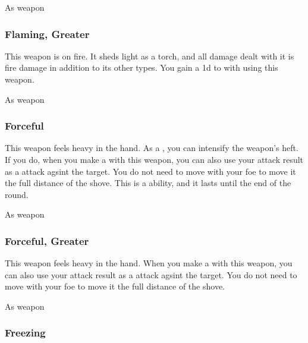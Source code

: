  As weapon


\lowercase{\hypertarget{item:Flaming, Greater}{}}\label{item:Flaming, Greater}
\hypertarget{item:Flaming, Greater}{\subsubsection{Flaming, Greater\hfill{}}}

This weapon is on fire.
It sheds light as a torch, and all damage dealt with it is fire damage in addition to its other types.
You gain a \plus1d  to  with  using this weapon.



 


 As weapon


\lowercase{\hypertarget{item:Forceful}{}}\label{item:Forceful}
\hypertarget{item:Forceful}{\subsubsection{Forceful\hfill{}}}

This weapon feels heavy in the hand.
As a , you can intensify the weapon's heft.
If you do, when you make a  with this weapon, you can also use your attack result as a  attack agsint the target.
You do not need to move with your foe to move it the full distance of the shove.
This is a  ability, and it lasts until the end of the round.



 As weapon


\lowercase{\hypertarget{item:Forceful, Greater}{}}\label{item:Forceful, Greater}
\hypertarget{item:Forceful, Greater}{\subsubsection{Forceful, Greater\hfill{}}}

This weapon feels heavy in the hand.
When you make a  with this weapon, you can also use your attack result as a  attack agsint the target.
You do not need to move with your foe to move it the full distance of the shove.



 As weapon


\lowercase{\hypertarget{item:Freezing}{}}\label{item:Freezing}
\hypertarget{item:Freezing}{\subsubsection{Freezing\hfill{}}}

